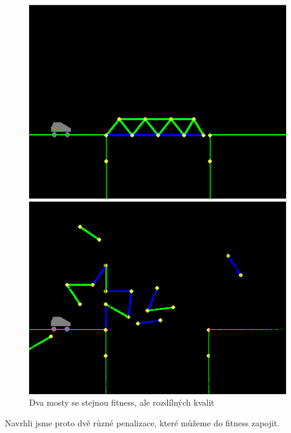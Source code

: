 \begin{figure}[ht]
    \centering
    \begin{minipage}{0.49\textwidth}
        \centering
       \includegraphics[width=\linewidth]{img/almost_good_bridge.png}
    \end{minipage}\hfill
    \begin{minipage}{0.49\textwidth}
        \centering
        \includegraphics[width=\linewidth]{img/bad_bridge.png}
    \end{minipage}
    \caption{Dva mosty se stejnou fitness, ale rozdílných kvalit}
    \label{impl-fig:6}
\end{figure}

Navrhli jsme proto dvě různé penalizace, které můžeme do fitness zapojit.

